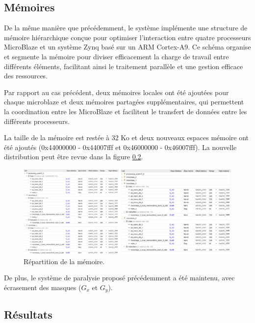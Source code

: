\documentclass[../CSC_5RO07_TA.tex]{subfiles}
\begin{document}
\subsection{Mémoires}

De la même manière que précédemment, le système implémente une structure de mémoire hiérarchique conçue pour optimiser l'interaction entre quatre processeurs MicroBlaze et un système Zynq basé sur un ARM Cortex-A9. Ce schéma organise et segmente la mémoire pour diviser efficacement la charge de travail entre différents éléments, facilitant ainsi le traitement parallèle et une gestion efficace des ressources.

\vspace{1em}

Par rapport au cas précédent, deux mémoires locales ont été ajoutées pour chaque microblaze et deux mémoires partagées supplémentaires, qui permettent la coordination entre les MicroBlaze et facilitent le transfert de données entre les différents processeurs.

\vspace{1em}

La taille de la mémoire est restée à 32 Ko et deux nouveaux espaces mémoire ont été ajoutés (0x44000000 - 0x44007fff et 0x46000000 - 0x46007fff). La nouvelle distribution peut être revue dans la figure \ref{}.

\begin{figure}[H]
    \centering
    \includegraphics[width=1.0\columnwidth]{./images/Memoria2.jpg}
    \caption{Répartition de la mémoire.}
    \label{fig:010}
\end{figure}

De plus, le système de paralysie proposé précédemment a été maintenu, avec écrasement des masques ($G_x$ et $G_y$).


\subsection{Résultats}
\end{document}
